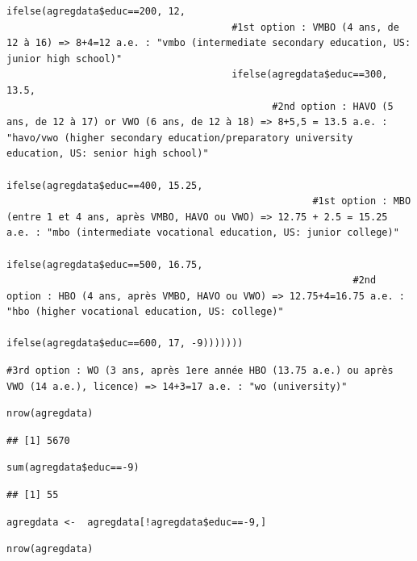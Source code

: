 \documentclass[a4paper, french, 11 pt]{article}\usepackage[]{graphicx}\usepackage[]{xcolor}
\makeatletter
\newenvironment{kframe}{%
 \def\at@end@of@kframe{}%
 \ifinner\ifhmode%
  \def\at@end@of@kframe{\end{minipage}}%
  \begin{minipage}{\columnwidth}%
 \fi\fi%
 \def\FrameCommand##1{\hskip\@totalleftmargin \hskip-\fboxsep
 \colorbox{shadecolor}{##1}\hskip-\fboxsep
     \hskip-\linewidth \hskip-\@totalleftmargin \hskip\columnwidth}%
 \MakeFramed {\advance\hsize-\width
   \@totalleftmargin\z@ \linewidth\hsize
   \@setminipage}}%
 {\par\unskip\endMakeFramed%
 \at@end@of@kframe}
\newenvironment{knitrout}{}{} %
\makeatother
\begin{document}
\begin{knitrout}
\begin{kframe}
\begin{lstlisting}[basicstyle=\ttfamily,breaklines=true]
                                ifelse(agregdata$educ==200, 12,
                                       #1st option : VMBO (4 ans, de 12 à 16) => 8+4=12 a.e. : "vmbo (intermediate secondary education, US: junior high school)"
                                       ifelse(agregdata$educ==300, 13.5,
                                              #2nd option : HAVO (5 ans, de 12 à 17) or VWO (6 ans, de 12 à 18) => 8+5,5 = 13.5 a.e. : "havo/vwo (higher secondary education/preparatory university education, US: senior high school)"
                                              ifelse(agregdata$educ==400, 15.25,
                                                     #1st option : MBO (entre 1 et 4 ans, après VMBO, HAVO ou VWO) => 12.75 + 2.5 = 15.25 a.e. : "mbo (intermediate vocational education, US: junior college)"
                                                     ifelse(agregdata$educ==500, 16.75,
                                                            #2nd option : HBO (4 ans, après VMBO, HAVO ou VWO) => 12.75+4=16.75 a.e. : "hbo (higher vocational education, US: college)"
                                                            ifelse(agregdata$educ==600, 17, -9)))))))\end{lstlisting}
\begin{lstlisting}[basicstyle=\ttfamily,breaklines=true]
#3rd option : WO (3 ans, après 1ere année HBO (13.75 a.e.) ou après VWO (14 a.e.), licence) => 14+3=17 a.e. : "wo (university)"\end{lstlisting}
\begin{lstlisting}[basicstyle=\ttfamily,breaklines=true]
nrow(agregdata)\end{lstlisting}
\begin{lstlisting}[basicstyle=\ttfamily,breaklines=true]
## [1] 5670
\end{lstlisting}
\begin{lstlisting}[basicstyle=\ttfamily,breaklines=true]
sum(agregdata$educ==-9)\end{lstlisting}
\begin{lstlisting}[basicstyle=\ttfamily,breaklines=true]
## [1] 55
\end{lstlisting}
\begin{lstlisting}[basicstyle=\ttfamily,breaklines=true]
agregdata <-  agregdata[!agregdata$educ==-9,]\end{lstlisting}
\begin{lstlisting}[basicstyle=\ttfamily,breaklines=true]
nrow(agregdata)\end{lstlisting}
\begin{lstlisting}[basicstyle=\ttfamily,breaklines=true]

\end{lstlisting}
\end{kframe}
\end{knitrout}
\end{document}
